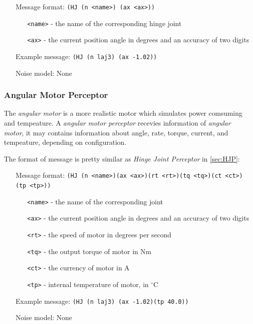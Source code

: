 
\begin{itemize}
	\item[Message format:] \texttt{(HJ (n <name>) (ax <ax>))}
		\begin{itemize}
		  \item[\texttt{<name>} -] the name of the corresponding hinge joint
		  \item[\texttt{<ax>} -] the current position angle in degrees and an accuracy
		  of two digits
		\end{itemize}
	\item[Example message:] \texttt{(HJ (n laj3) (ax -1.02))}
	\item[Noise model:] None
\end{itemize}

\subsubsection{Angular Motor Perceptor}
\label{sec:AMP}
The \emph{angular motor} is a more realistic motor which simulates
power comsuming and tempeature. A \emph{angular motor perceptor}
recevies information of \emph{angular motor}, it may contains
information about angle, rate, torque, current, and tempeature,
depending on configuration.

The format of message is pretty similar as \emph{Hinge Joint
  Perceptor} in \ref{sec:HJP}:

\begin{itemize}
        \item[Message format:] \texttt{(HJ (n <name>)(ax <ax>)(rt <rt>)(tq <tq>)(ct <ct>)(tp <tp>))}
                \begin{itemize}
                  \item[\texttt{<name>} -] the name of the corresponding joint
                  \item[\texttt{<ax>} -] the current position angle in degrees and an accuracy
                  of two digits
                  \item[\texttt{<rt>} -] the speed of motor in degrees per second
                  \item[\texttt{<tq>} -] the output torque of motor in Nm
                  \item[\texttt{<ct>} -] the currency of motor in A
                  \item[\texttt{<tp>} -] internal temperature of motor, in $^\circ$C
                \end{itemize}
        \item[Example message:] \texttt{(HJ (n laj3) (ax -1.02)(tp 40.0))}
        \item[Noise model:] None
\end{itemize}

